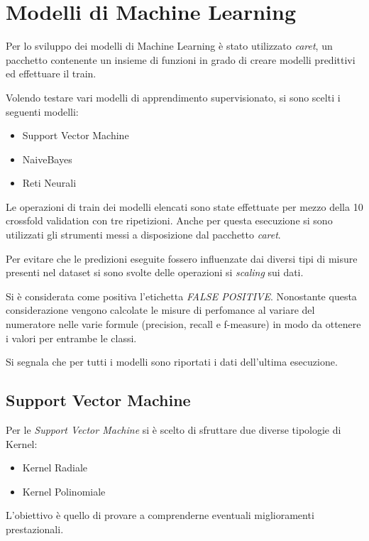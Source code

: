 \chapter{Modelli di Machine Learning}
Per lo sviluppo dei modelli di Machine Learning è stato utilizzato
\textit{caret}, un pacchetto contenente un insieme di funzioni in grado di 
creare modelli predittivi ed effettuare il train.

Volendo testare vari modelli di apprendimento supervisionato, si sono 
scelti i seguenti modelli:
\begin{itemize}
    \item Support Vector Machine
    \item NaiveBayes
    \item Reti Neurali
\end{itemize}
    
Le operazioni di train dei modelli elencati sono state effettuate 
per mezzo della 10 crossfold validation con tre ripetizioni. 
Anche per questa esecuzione si sono utilizzati 
gli strumenti messi a disposizione dal pacchetto \textit{caret}.

Per evitare che le predizioni eseguite fossero influenzate dai diversi tipi di misure 
presenti nel dataset si sono svolte delle operazioni si \textit{scaling} sui dati.

Si è considerata come positiva l'etichetta \textit{FALSE POSITIVE}.
Nonostante questa considerazione vengono calcolate le misure di perfomance
al variare del numeratore nelle varie formule (precision, recall e 
f-measure) in modo da ottenere i valori per entrambe le classi.

\begin{mdframed}[backgroundcolor=yellow!20] 
    Si segnala che per tutti i modelli sono riportati i dati dell'ultima esecuzione.
\end{mdframed}

\section{Support Vector Machine}
Per le \textit{Support Vector Machine} si è scelto di sfruttare due diverse tipologie di Kernel:
\begin{itemize}
    \item Kernel Radiale
    \item Kernel Polinomiale
\end{itemize}
L'obiettivo è quello di provare a comprenderne eventuali miglioramenti prestazionali.

